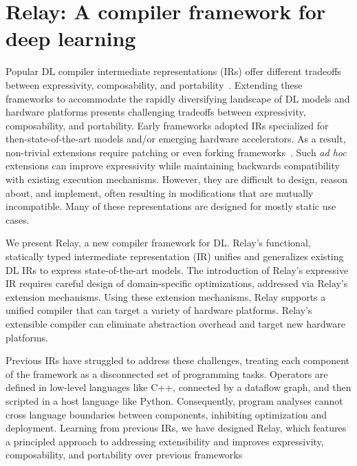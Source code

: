 \chapter{Relay: A compiler framework for deep learning}
\label{ch:relay}

Popular DL compiler intermediate representations (IRs) offer different tradeoffs
between expressivity, composability, and portability~\citep{
  tensorflow, pytorch_ad, chainer_learningsys2015, tangent, theano, glow}.
Extending these frameworks to accommodate
  the rapidly diversifying landscape of
  DL models and hardware platforms presents
  challenging tradeoffs between
  expressivity, composability, and portability.
Early frameworks adopted IRs
  specialized for then-state-of-the-art models and/or
  emerging hardware accelerators.
As a result, non-trivial extensions require
  patching or even forking frameworks~\citep{
    tf_fold, tf_lite, tangent, tf_eager, xla, glow, torchscript}.
Such \textit{ad hoc} extensions can improve expressivity
  while maintaining backwards compatibility with existing execution mechanisms.
However, they are difficult to design, reason about, and implement,
  often resulting in modifications that are mutually incompatible.
Many of these representations are designed for mostly static
  use cases.

We present Relay,
  a new compiler framework for DL.
Relay's functional, statically typed intermediate representation (IR)
  unifies and generalizes existing DL IRs
  to express state-of-the-art models.
The introduction of Relay's expressive IR requires
  careful design of domain-specific optimizations,
  addressed via Relay's extension mechanisms.
Using these extension mechanisms,
  Relay supports a unified compiler that
  can target a variety of hardware platforms.
Relay's extensible compiler
   can eliminate abstraction overhead and
   target new hardware platforms.

Previous IRs have struggled to address these challenges, treating each
  component of the framework as a disconnected set of programming tasks.
Operators are defined in low-level languages like C++,
  connected by a dataflow graph, and then scripted
  in a host language like Python.
Consequently,
  program analyses cannot cross language boundaries between components,
  inhibiting optimization and deployment.
Learning from previous IRs, we have designed Relay,
  which features a principled approach to addressing extensibility
  and improves expressivity, composability, and portability
  over previous frameworks

